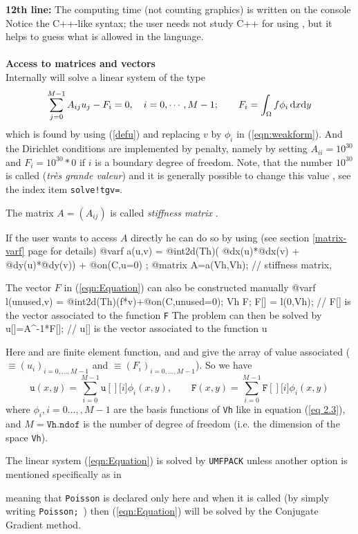 \documentclass[a4paper,twoside,12pt]{book}
\def\d{\hbox{d}}
\begin{document}
\textbf{12th line:} The computing time (not counting graphics) is written on the console
Notice the C++-like syntax; the user needs not study C++ for using \freefempp,
but it helps to guess what is allowed in the language.
\\\\
\textbf{Access to matrices and vectors}
\\
Internally \freefempp will solve a linear system of the type
\begin{eqnarray}
\label{eqn:Equation}
\sum_{j=0}^{M-1} A_{ij}u_j - F_i=0 ,\quad i=0,\cdots,M-1;\qquad
F_i=\int_{\Omega}f\phi_i\, \d x\d y
\end{eqnarray}
which is found by using (\ref{defu}) and replacing $v$ by $\phi_i$
in (\ref{eqn:weakform}).
And the Dirichlet conditions are implemented by penalty,
namely by setting $A_{ii}=10^{30}$  and
 $F_i=  10^{30}*0$ if $i$ is a boundary degree of freedom. Note, that the number $10^{30}$ is called 
 (\emph{tr\`es grande valeur})
 and it is generally possible to change this value , see the index item \texttt{solve!tgv=}.

\medskip{}

The matrix $A=(A_{ij})$ is called \emph{stiffness matrix} .


If the user wants to access $A$ directly he can do so
by using (see section \ref{matrix-varf} page \pageref{matrix-varf} for details)
\bFF
@varf a(u,v) = @int2d(Th)( @dx(u)*@dx(v) + @dy(u)*@dy(v))
               + @on(C,u=0) ;
@matrix A=a(Vh,Vh);  // stiffness matrix,
\eFF

The vector $F$ 
in (\ref{eqn:Equation}) can also be constructed manually
\bFF
@varf l(unused,v) = @int2d(Th)(f*v)+@on(C,unused=0);
Vh F;  F[] = l(0,Vh); //  F[] is the vector associated to the function \texttt{F}
\eFF
The problem can then be solved by
\bFF
 u[]=A^-1*F[]; // u[] is the vector associated to the function u
\eFF
\begin{note}
  Here  and  are finite element function, and   and
   give  the array of value associated ( $\equiv (u_i)_{i=0,\dots,M-1}$ and
  $\equiv (F_i)_{i=0,\dots,M-1}$). So we have
   $$
   \mathtt{u}(x,y) = \sum_{i=0}^{M-1} \mathtt{u[][}i\mathtt{]} \phi_i(x,y) ,
   \qquad \mathtt{F}(x,y) = \sum_{i=0}^{M-1} \mathtt{F[][}i\mathtt{]} \phi_i(x,y)
   $$
   where $\phi_i, i=0...,,M-1$ are the basis functions of  \texttt{Vh} like in equation
   (\ref{eq 2.3}), and $M = \mathtt{Vh.ndof}$ is  the number of degree of freedom (i.e. the dimension of the space \texttt{Vh}).

\end{note}
The linear system (\ref{eqn:Equation}) is solved by \texttt{UMFPACK}
unless another option is mentioned specifically  as in
\begin{center}
\end{center}
meaning that \texttt{Poisson} is declared only here and when it is called (by simply writing \texttt{Poisson;}~) then
 (\ref{eqn:Equation}) will be solved by the Conjugate Gradient method.
\end{document}
